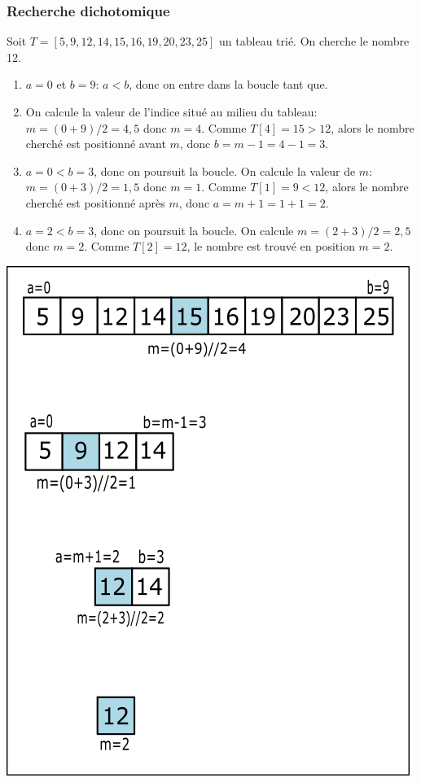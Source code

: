 \documentclass[9pt]{beamer}
\newcounter{num}
\begin{document}
\begin{frame}
\frametitle{Recherche dichotomique}

Soit $T=[5,9,12,14,15,16,19,20,23,25]$ un tableau trié. On cherche le nombre 12.\medskip

\begin{minipage}{7.2cm}
\begin{enumerate}
\item $a=0$ et $b=9$: $a<b$, donc on entre dans la boucle tant que.
\item On calcule la valeur de l'indice situé au milieu du tableau: $m=(0+9)/2=4,5$ donc $m=4$. Comme $T[4]=15>12$, alors le nombre cherché est positionné avant $m$, donc $b=m-1=4-1=3$.
\item $a=0<b=3$, donc on poursuit la boucle. On calcule la valeur de $m$: $m=(0+3)/2=1,5$ donc $m=1$. Comme $T[1]=9<12$, alors le nombre cherché est positionné après $m$, donc $a=m+1=1+1=2$.
\item $a=2<b=3$, donc on poursuit la boucle. On calcule $m=(2+3)/2=2,5$ donc $m=2$. Comme $T[2]=12$, le nombre est trouvé en position $m=2$.
\end{enumerate}
\end{minipage}\hfill
\begin{minipage}{4.6cm}
\includegraphics[scale=0.35]{../img/dichotomie.png}
\end{minipage}

\end{frame}
\end{document}
